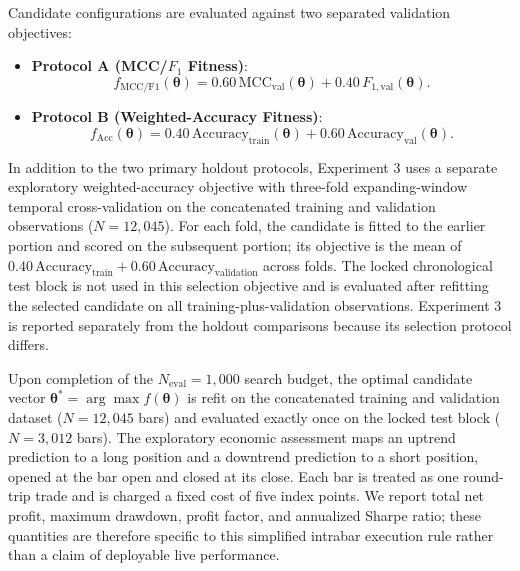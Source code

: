 Candidate configurations are evaluated against two separated validation objectives:
\begin{itemize}
    \item \textbf{Protocol A (MCC/$F_1$ Fitness)}:
    \begin{equation}\label{eq:fitness_protocol_a}
    f_{\mathrm{MCC/F1}}(\boldsymbol{\theta}) = 0.60\,\mathrm{MCC}_{\mathrm{val}}(\boldsymbol{\theta}) + 0.40\,F_{1,\mathrm{val}}(\boldsymbol{\theta}).
    \end{equation}
    \item \textbf{Protocol B (Weighted-Accuracy Fitness)}:
    \begin{equation}\label{eq:fitness_protocol_b}
    f_{\mathrm{Acc}}(\boldsymbol{\theta}) = 0.40\,\mathrm{Accuracy}_{\mathrm{train}}(\boldsymbol{\theta}) + 0.60\,\mathrm{Accuracy}_{\mathrm{val}}(\boldsymbol{\theta}).
    \end{equation}
\end{itemize}

In addition to the two primary holdout protocols, Experiment 3 uses a separate exploratory weighted-accuracy objective with three-fold expanding-window temporal cross-validation on the concatenated training and validation observations ($N=12{,}045$). For each fold, the candidate is fitted to the earlier portion and scored on the subsequent portion; its objective is the mean of $0.40\,\mathrm{Accuracy}_{\mathrm{train}}+0.60\,\mathrm{Accuracy}_{\mathrm{validation}}$ across folds. The locked chronological test block is not used in this selection objective and is evaluated after refitting the selected candidate on all training-plus-validation observations. Experiment 3 is reported separately from the holdout comparisons because its selection protocol differs.

Upon completion of the $N_{\mathrm{eval}} = 1{,}000$ search budget, the optimal candidate vector $\boldsymbol{\theta}^* = \arg\max f(\boldsymbol{\theta})$ is refit on the concatenated training and validation dataset ($N = 12{,}045$ bars) and evaluated exactly once on the locked test block ($N = 3{,}012$ bars). The exploratory economic assessment maps an uptrend prediction to a long position and a downtrend prediction to a short position, opened at the bar open and closed at its close. Each bar is treated as one round-trip trade and is charged a fixed cost of five index points. We report total net profit, maximum drawdown, profit factor, and annualized Sharpe ratio; these quantities are therefore specific to this simplified intrabar execution rule rather than a claim of deployable live performance.

